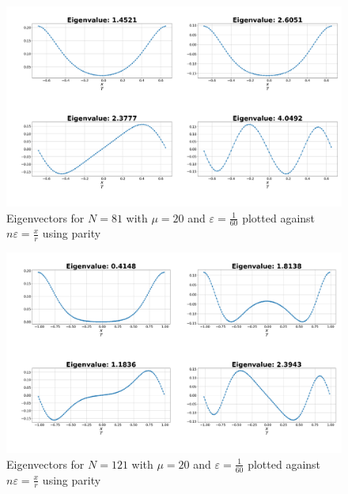 \documentclass[11pt, letterpaper, onecolumn]{article}
\begin{document}
 	\begin{figure} [H] 
	\begin{center}
	\includegraphics[width=15cm]{"inf_vol_lim_N81.png"}
	\caption{Eigenvectors for $N=81$ with $\mu=20$ and $\varepsilon=\frac{1}{60}$ plotted against $n\varepsilon=\frac{x}{r}$ using parity}
	\end{center}
	\end{figure}

 	\begin{figure} [H] 
	\begin{center}
	\includegraphics[width=15cm]{"inf_vol_lim_N121.png"}
	\caption{Eigenvectors for $N=121$ with $\mu=20$ and $\varepsilon=\frac{1}{60}$ plotted against $n\varepsilon=\frac{x}{r}$ using parity}
	\end{center}
	\end{figure}
\end{document}
